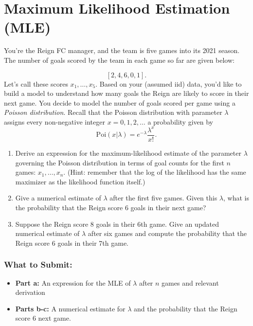 \documentclass{article}
\begin{document}
\section*{Maximum Likelihood Estimation (MLE)}

\begin{aprob}
    You're the Reign FC manager, and the team is five games into its 2021 season. The number of goals scored by the team in each game so far are given below:
    
    \[
      [2, 4, 6, 0, 1].
    \]
    Let's call these scores $x_1, \dots, x_5$. Based on your (assumed iid) data, you'd like to build a model to understand how many goals the Reign are likely to score in their next game. You decide to model the number of goals scored per game using a \emph{Poisson distribution}. Recall that the Poisson distribution with parameter $\lambda$ assigns every non-negative integer $x = 0, 1, 2, \dots$ a probability given by
    \[
      \mathrm{Poi}(x | \lambda) = e^{-\lambda} \frac{\lambda ^ x}{x!}.
    \]
    
    \begin{enumerate}
        \item {} Derive an expression for the maximum-likelihood estimate of the parameter $\lambda$ governing the Poisson distribution in terms of goal counts for the first $n$ games: $x_1, \dots, x_n$. (Hint: remember that the log of the likelihood has the same maximizer as the likelihood function itself.)
        \item {} Give a numerical estimate of $\lambda$ after the first five games. Given this $\lambda$, what is the probability that the Reign score $6$ goals in their next game?
        \item {} Suppose the Reign score 8 goals in their 6th game. Give an updated numerical estimate of $\lambda$ after six games and compute the probability that the Reign score $6$ goals in their 7th game.
    \end{enumerate}
    \subsubsection*{What to Submit:}
    \begin{itemize}
        \item \textbf{Part a:} An expression for the MLE of $\lambda$ after $n$ games and relevant derivation
        \item \textbf{Parts b-c:} A numerical estimate for $\lambda$ and the probability that the Reign score 6 next game.
    \end{itemize}
        \begin{tcolorbox}[colback=lightgray!10!white, colframe=black, title=A2.a]
            

\end{tcolorbox}
\end{aprob}
\end{document}
